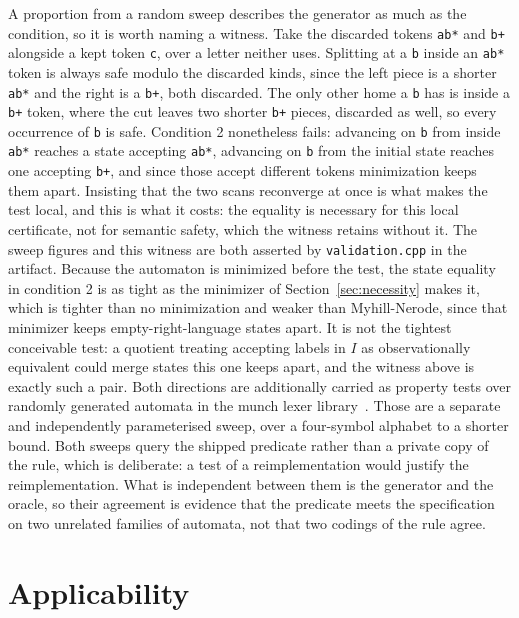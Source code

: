 \documentclass[11pt,a4paper]{article}
\theoremstyle{definition}
\theoremstyle{plain}
\newcommand{\code}[1]{\texttt{#1}}
\begin{document}
A proportion from a random sweep describes the generator as much as the condition, so it is worth naming a witness.
Take the discarded tokens \code{ab*} and \code{b+} alongside a kept token \code{c}, over a letter neither uses.
Splitting at a \code{b} inside an \code{ab*} token is always safe modulo the discarded kinds, since the left piece is
a shorter \code{ab*} and the right is a \code{b+}, both discarded. The only other home a \code{b} has is inside a
\code{b+} token, where the cut leaves two shorter \code{b+} pieces, discarded as well, so every occurrence of \code{b}
is safe. Condition 2 nonetheless fails: advancing on \code{b} from inside \code{ab*} reaches a state accepting
\code{ab*}, advancing on \code{b} from the initial state reaches one accepting \code{b+}, and since those accept
different tokens minimization keeps them apart. Insisting that the two scans reconverge at once is what makes the test
local, and this is what it costs: the equality is necessary for this local certificate, not for semantic safety, which
the witness retains without it. The sweep figures and this witness are both asserted by \code{validation.cpp} in the
artifact. Because the automaton is minimized before the test, the state equality in condition 2 is as tight as the
minimizer of Section~\ref{sec:necessity} makes it, which is tighter than no minimization and weaker than
Myhill-Nerode, since that minimizer keeps empty-right-language states apart. It is not the tightest conceivable test:
a quotient treating accepting labels in $I$ as observationally equivalent could merge states this one keeps apart, and
the witness above is exactly such a pair. Both directions are additionally carried as property tests over randomly
generated automata in the munch lexer library~\cite{munch}. Those are a separate and independently parameterised
sweep, over a four-symbol alphabet to a shorter bound. Both sweeps query the shipped predicate rather than a private
copy of the rule, which is deliberate: a test of a reimplementation would justify the reimplementation. What is
independent between them is the generator and the oracle, so their agreement is evidence that the predicate meets the
specification on two unrelated families of automata, not that two codings of the rule agree.

\section{Applicability}
\label{sec:applicability}
\end{document}
